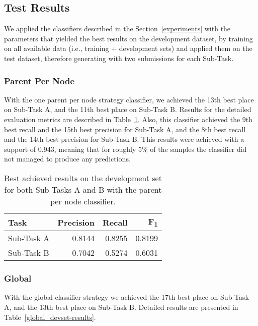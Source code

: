 \documentclass[11pt,a4paper]{article}
\begin{document}
\subsection{Test Results}

We applied the classifiers described in the Section~\ref{experiments} with the
parameters that yielded the best results on the development dataset, by training
on all available data (i.e., training + development sets) and applied them
on the test dataset, therefore generating with two submissions for each Sub-Task.

\subsubsection{Parent Per Node}

With the one parent per node strategy classifier, we achieved the 13th best place
on Sub-Task A, and the 11th best place on Sub-Task B. Results for the detailed
evaluation metrics are described in Table~\ref{local_devset-results}. Also, this
classifier achieved the 9th best recall and the 15th best precision for Sub-Task A,
and the 8th best recall and the 14th best precision for Sub-Task B. This results were
achieved with a support of 0.943, meaning that for roughly 5\% of the samples the
classifier did not managed to produce any predictions.


\begin{table}[!h]
\begin{center}
\begin{tabular}{|l|r|r|r|}
\hline\centering\textbf{Task}  & \textbf{Precision} &  \textbf{Recall} &  \textbf{F\textsubscript{1}}\\
\hline
 Sub-Task A   &  0.8144 & 0.8255 & 0.8199 \\
 Sub-Task B   &  0.7042 & 0.5274 & 0.6031 \\
\hline
\end{tabular}
\end{center}
\caption{\label{local_devset-results} Best achieved results on the development
          set for both Sub-Tasks A and B with the parent per node classifier.}
\end{table}





\subsubsection{Global}

With the global classifier strategy we achieved the 17th best place on Sub-Task A,
and the 13th best place on Sub-Task B. Detailed results are presented in
Table~\ref{global_devset-results}.
\end{document}
